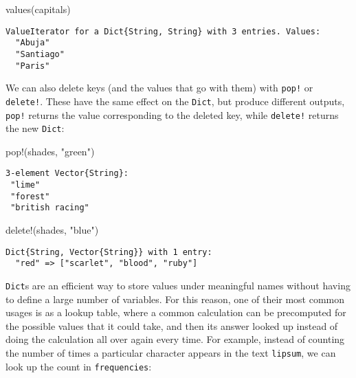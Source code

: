 \documentclass[
  letterpaper,
  DIV=11,
  numbers=noendperiod]{scrreprt}
\newenvironment{Shaded}{\begin{snugshade}}{\end{snugshade}}
\newcommand{\FunctionTok}[1]{\textcolor[rgb]{0.28,0.35,0.67}{#1}}
\newcommand{\NormalTok}[1]{\textcolor[rgb]{0.00,0.23,0.31}{#1}}
\newcommand{\StringTok}[1]{\textcolor[rgb]{0.13,0.47,0.30}{#1}}
\begin{document}
\begin{Shaded}
\begin{Highlighting}[]
\FunctionTok{values}\NormalTok{(capitals)}
\end{Highlighting}
\end{Shaded}

\begin{verbatim}
ValueIterator for a Dict{String, String} with 3 entries. Values:
  "Abuja"
  "Santiago"
  "Paris"
\end{verbatim}

We can also delete keys (and the values that go with them) with
\texttt{pop!} or \texttt{delete!}. These have the same effect on the
\texttt{Dict}, but produce different outputs, \texttt{pop!} returns the
value corresponding to the deleted key, while \texttt{delete!} returns
the new \texttt{Dict}:

\begin{Shaded}
\begin{Highlighting}[]
\FunctionTok{pop!}\NormalTok{(shades, }\StringTok{"green"}\NormalTok{)}
\end{Highlighting}
\end{Shaded}

\begin{verbatim}
3-element Vector{String}:
 "lime"
 "forest"
 "british racing"
\end{verbatim}

\begin{Shaded}
\begin{Highlighting}[]
\FunctionTok{delete!}\NormalTok{(shades, }\StringTok{"blue"}\NormalTok{)}
\end{Highlighting}
\end{Shaded}

\begin{verbatim}
Dict{String, Vector{String}} with 1 entry:
  "red" => ["scarlet", "blood", "ruby"]
\end{verbatim}

\texttt{Dict}s are an efficient way to store values under meaningful
names without having to define a large number of variables. For this
reason, one of their most common usages is as a lookup table, where a
common calculation can be precomputed for the possible values that it
could take, and then its answer looked up instead of doing the
calculation all over again every time. For example, instead of counting
the number of times a particular character appears in the text
\texttt{lipsum}, we can look up the count in \texttt{frequencies}:
\end{document}
